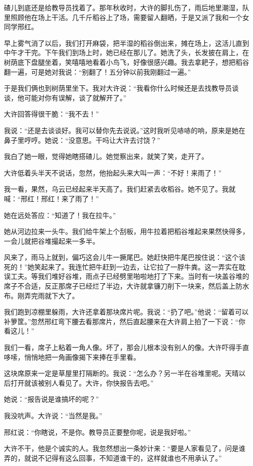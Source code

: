 碴儿到底还是给教导员找着了。那年秋收时，大许的脚扎伤了，雨后地里潮湿，队里照顾他在场上干活。几千斤稻谷上了场，需要留人翻晒，于是又派了我和一个女同学邢红。 

早上雾气消了以后，我们打开麻袋，把半湿的稻谷倒出来，摊在场上，这活儿直到中午才干完。下午我们到场上时，她已经在那儿了。她洗了头，长发披在肩上，在树荫底下盘腿坐着，笑嘻嘻地看着小鸟飞，好像很感兴趣。我去拿耙子，想把稻谷翻一遍，可是她对我说：“别翻了！五分钟以前我刚翻过一遍。” 

于是我们俩也到树荫里坐下。我对大许说：“我看你什么时候还是去找教导员谈谈，他可能对你有误解，谈了就解开了。” 

大许回答得很干脆：“我不去！” 

我说：“还是去谈谈好。我可以替你先去说说。”这时我听见哧哧的响，原来是她在鼻子里哼哼。她说：“没意思。干吗让大许去讨饶？” 

我白了她一眼，觉得她瞎搭碴儿。她觉察出来，就笑了笑，走开了。 

大许低着头半天不说话，忽然，他抬起头来大叫一声：“不好！来雨了！” 

我一看，果然，乌云已经起来半天高了。我们赶紧去收稻谷。她不见了。我就喊：“邢红！邢红！来了雨了！” 

她在远处答应：“知道了！我在拉牛。” 

她从河边拉来一头牛。我们给牛架上个刮板，用牛拉着把稻谷堆起来果然快得多，一会儿就把谷堆撮起来一多半。 

风来了，雨马上就到，偏巧这会儿牛一撅尾巴。她赶快把牛尾巴按住说：“这个该死的！”她笑起来了。我连忙把牛赶到一边去，让它拉了一脬牛粪。这一弄实在耽误工夫。等我们堆好谷堆，雨点子已经劈里啪啦地打了下来。当时有一块盖谷堆的席子不合适，反正那席子已经烂了半边，大许就拿镰刀削下一块来，然后盖上防水布。刚弄完雨就下大了。 

我们跑到凉棚里躲雨，大许还拿着那块席片呢。我说：“扔了吧。”他说：“留着可以补箩筐。”忽然邢红弯下腰去看那席片，然后直起腰来在大许肩上拍了一下说：“你看这儿！” 

我们一看，席子上粘着一角人像。坏了，那会儿根本没有别人的像。大许吓得手直哆嗦，悄悄地把一角画像揭下来捧在手里看。 

这块席原来一定是草屋里打隔断的。我说：“怎么办？另一半在谷堆里呢。天晴以后打开就该被别人看见了。大许，你快报告去吧。” 

她说：“报告说是谁搞坏的呢？” 

我没吭声。大许说：“当然是我。” 

邢红说：“你瞎说，不是你。教导员正要整你呢，说是我好啦。” 

大许不干，他是个诚实的人。我忽然想出一条妙计来：“要是人家看见了，问是谁弄的，就说不记得有这么回事，不知道谁干的，这样就谁也不用承认了。” 

